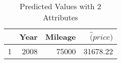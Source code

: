 \begin{table}[ht]
\centering
\begin{tabular}{rrrr}
  \hline
 & Year & Mileage & $\hat(price)$ \\ 
  \hline
1 & 2008 & 75000 & 31678.22 \\ 
   \hline
\end{tabular}
\caption{Predicted Values with 2 Attributes} 
\label{tab:2p_predict}
\end{table}
